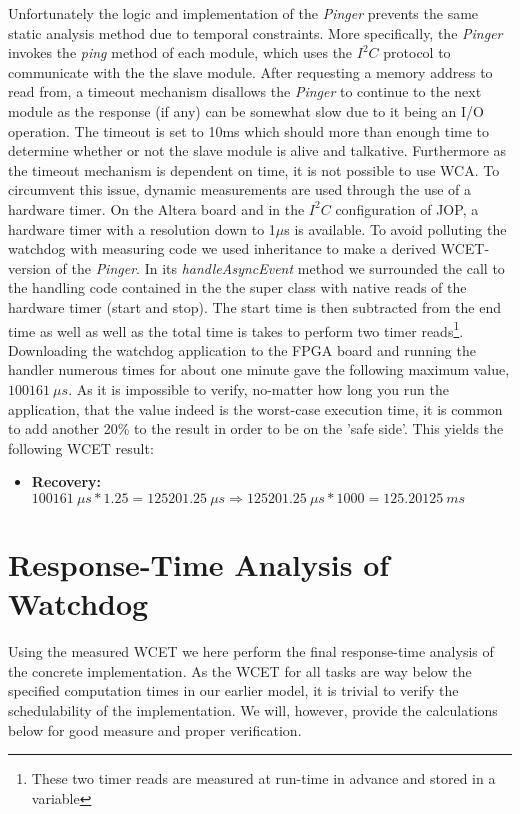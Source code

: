 Unfortunately the logic and implementation of the \textit{Pinger} prevents the same static analysis method due to temporal constraints. More specifically, the \textit{Pinger} invokes the \textit{ping} method of each module, which uses the $\textit{I}^2\textit{C}$ protocol to communicate with the the slave module. After requesting a memory address to read from, a timeout mechanism disallows the \textit{Pinger} to continue to the next module as the response (if any) can be somewhat slow due to it being an I/O operation. The timeout is set to 10ms which should more than enough time to determine whether or not the slave module is alive and talkative. Furthermore as the timeout mechanism is dependent on time, it is not possible to use WCA. To circumvent this issue, dynamic measurements are used through the use of a hardware timer. On the Altera board and in the $\textit{I}^2\textit{C}$ configuration of JOP, a hardware timer with a resolution down to 1$\mu$s is available. To avoid polluting the watchdog with measuring code we used inheritance to make a derived WCET-version of the \textit{Pinger}. In its \textit{handleAsyncEvent} method we surrounded the call to the handling code contained in the the super class with native reads of the hardware timer (start and stop). The start time is then subtracted from the end time as well as well as the total time is takes to perform two timer reads\footnote{These two timer reads are measured at run-time in advance and stored in a variable}. Downloading the watchdog application to the FPGA board and running the handler numerous times for about one minute gave the following maximum value, $100161\ \mu s $. As it is impossible to verify, no-matter how long you run the application, that the value indeed is the worst-case execution time, it is common to add another 20\% to the result in order to be on the 'safe side'. This yields the following WCET result:

\begin{itemize}
    \item \textbf{Recovery:} $100161\ \mu s * 1.25 = 125201.25\ \mu s \Rightarrow 125201.25\ \mu s * 1000 = 125.20125\ ms$
\end{itemize}


\section{Response-Time Analysis of Watchdog} %
\label{sec:response_time_analysis_of_watchdog}
Using the measured WCET we here perform the final response-time analysis of the concrete implementation. As the WCET for all tasks are way below the specified computation times in our earlier model, it is trivial to verify the schedulability of the implementation. We will, however, provide the calculations below for good measure and proper verification.

